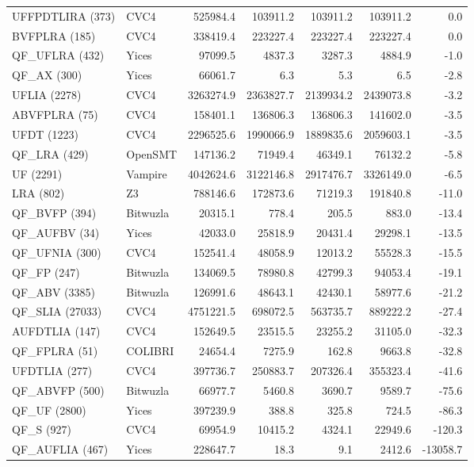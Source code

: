 \begin{tabular}{l@{\hspace{1em}}lrrrrr}
UFFPDTLIRA (373)     & CVC4         & 525984.4    & 103911.2    & 103911.2    & 103911.2    & 0.0 \\
BVFPLRA (185)        & CVC4         & 338419.4    & 223227.4    & 223227.4    & 223227.4    & 0.0 \\
QF\_UFLRA (432)      & Yices        & 97099.5     & 4837.3      & 3287.3      & 4884.9      & -1.0\\
QF\_AX (300)         & Yices        & 66061.7     & 6.3         & 5.3         & 6.5         & -2.8\\
UFLIA (2278)         & CVC4         & 3263274.9   & 2363827.7   & 2139934.2   & 2439073.8   & -3.2\\
ABVFPLRA (75)        & CVC4         & 158401.1    & 136806.3    & 136806.3    & 141602.0    & -3.5\\
UFDT (1223)          & CVC4         & 2296525.6   & 1990066.9   & 1889835.6   & 2059603.1   & -3.5\\
QF\_LRA (429)        & OpenSMT      & 147136.2    & 71949.4     & 46349.1     & 76132.2     & -5.8\\
UF (2291)            & Vampire      & 4042624.6   & 3122146.8   & 2917476.7   & 3326149.0   & -6.5\\
LRA (802)            & Z3           & 788146.6    & 172873.6    & 71219.3     & 191840.8    & -11.0\\
QF\_BVFP (394)       & Bitwuzla     & 20315.1     & 778.4       & 205.5       & 883.0       & -13.4\\
QF\_AUFBV (34)       & Yices        & 42033.0     & 25818.9     & 20431.4     & 29298.1     & -13.5\\
QF\_UFNIA (300)      & CVC4         & 152541.4    & 48058.9     & 12013.2     & 55528.3     & -15.5\\
QF\_FP (247)         & Bitwuzla     & 134069.5    & 78980.8     & 42799.3     & 94053.4     & -19.1\\
QF\_ABV (3385)       & Bitwuzla     & 126991.6    & 48643.1     & 42430.1     & 58977.6     & -21.2\\
QF\_SLIA (27033)     & CVC4         & 4751221.5   & 698072.5    & 563735.7    & 889222.2    & -27.4\\
AUFDTLIA (147)       & CVC4         & 152649.5    & 23515.5     & 23255.2     & 31105.0     & -32.3\\
QF\_FPLRA (51)       & COLIBRI      & 24654.4     & 7275.9      & 162.8       & 9663.8      & -32.8\\
UFDTLIA (277)        & CVC4         & 397736.7    & 250883.7    & 207326.4    & 355323.4    & -41.6\\
QF\_ABVFP (500)      & Bitwuzla     & 66977.7     & 5460.8      & 3690.7      & 9589.7      & -75.6\\
QF\_UF (2800)        & Yices        & 397239.9    & 388.8       & 325.8       & 724.5       & -86.3\\
QF\_S (927)          & CVC4         & 69954.9     & 10415.2     & 4324.1      & 22949.6     & -120.3\\
QF\_AUFLIA (467)     & Yices        & 228647.7    & 18.3        & 9.1         & 2412.6      & -13058.7\\
\bottomrule
\end{tabular}